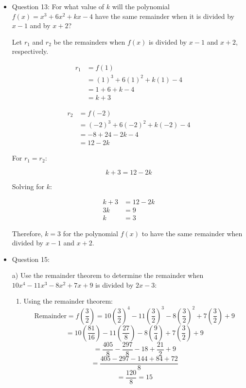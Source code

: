 \documentclass{article}
\begin{document}
\begin{itemize}
\item Question 13:
For what value of \(k\) will the polynomial \(f(x) = x^3 + 6x^2 + kx - 4\) have the same remainder when it is divided by \(x - 1\) and by \(x + 2\)?

Let \(r_1\) and \(r_2\) be the remainders when \(f(x)\) is divided by \(x - 1\) and \(x + 2\), respectively.

\[
\begin{aligned}
    r_1 &= f(1) \\
    &= (1)^3 + 6(1)^2 + k(1) - 4 \\
    &= 1 + 6 + k - 4 \\
    &= k + 3
\end{aligned}
\]

\[
\begin{aligned}
    r_2 &= f(-2) \\
    &= (-2)^3 + 6(-2)^2 + k(-2) - 4 \\
    &= -8 + 24 - 2k - 4 \\
    &= 12 - 2k
\end{aligned}
\]

For \(r_1 = r_2\):

\[
k + 3 = 12 - 2k
\]

Solving for \(k\):

\[
\begin{aligned}
    k + 3 &= 12 - 2k \\
    3k &= 9 \\
    k &= 3
\end{aligned}
\]

Therefore, \(k = 3\) for the polynomial \(f(x)\) to have the same remainder when divided by \(x - 1\) and \(x + 2\).



\item Question 15:

a) Use the remainder theorem to determine the remainder when \(10x^4 - 11x^3 - 8x^2 + 7x + 9\) is divided by \(2x - 3\):

\begin{enumerate}
    \item Using the remainder theorem:
    \[
    \text{Remainder} = f\left(\frac{3}{2}\right) = 10\left(\frac{3}{2}\right)^4 - 11\left(\frac{3}{2}\right)^3 - 8\left(\frac{3}{2}\right)^2 + 7\left(\frac{3}{2}\right) + 9
    \]
    \[
    = 10\left(\frac{81}{16}\right) - 11\left(\frac{27}{8}\right) - 8\left(\frac{9}{4}\right) + 7\left(\frac{3}{2}\right) + 9
    \]
    \[
    = \frac{405}{8} - \frac{297}{8} - 18 + \frac{21}{2} + 9
    \]
    \[
    = \frac{405 - 297 - 144 + 84 + 72}{8}
    \]
    \[
    = \frac{120}{8} = 15
    \]
\end{enumerate}


\end{itemize}
\end{document}
